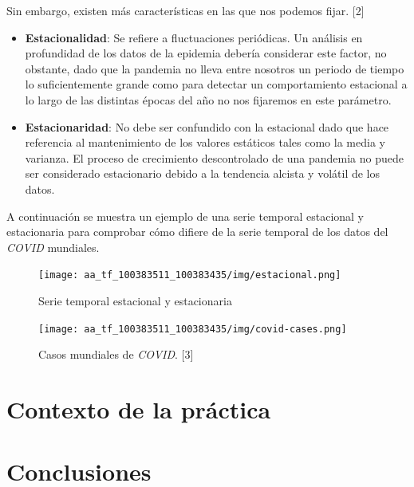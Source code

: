 \documentclass[12pt,a4paper, xcolor=table]{article}
\begin{document}
        \vspace{2mm}
        
        Sin embargo, existen más características en las que nos podemos fijar. [2] 
    \begin{itemize}
    \item \textbf{Estacionalidad}: Se refiere a fluctuaciones periódicas. Un análisis en profundidad de los datos de la epidemia debería considerar este factor, no obstante, dado que la pandemia no lleva entre nosotros un periodo de tiempo lo suficientemente grande como para detectar un comportamiento estacional a lo largo de las distintas épocas del año no nos fijaremos en este parámetro.
    \item \textbf{Estacionaridad}: No debe ser confundido con la estacional dado que hace referencia al mantenimiento de los valores estáticos tales como la media y varianza. El proceso de crecimiento descontrolado de una pandemia no puede ser considerado estacionario debido a la tendencia alcista y volátil de los datos.
    \end{itemize}
    
    A continuación se muestra un ejemplo de una serie temporal estacional y estacionaria para comprobar cómo difiere de la serie temporal de los datos del \textit{COVID} mundiales.
    
        \begin{figure}[h]
                \centering
                \texttt{[image: aa\_tf\_100383511\_100383435/img/estacional.png]}
                \caption{Serie temporal estacional y estacionaria}
                \label{fig:graf_exp1}
            \end{figure}
            
            
        \begin{figure}[h]
                \centering
                \texttt{[image: aa\_tf\_100383511\_100383435/img/covid-cases.png]}
                \caption{Casos mundiales de \textit{COVID}. [3]}
                \label{fig:graf_exp1}
            \end{figure}
            



\section{Contexto de la práctica}


 \section{Conclusiones}
\end{document}
